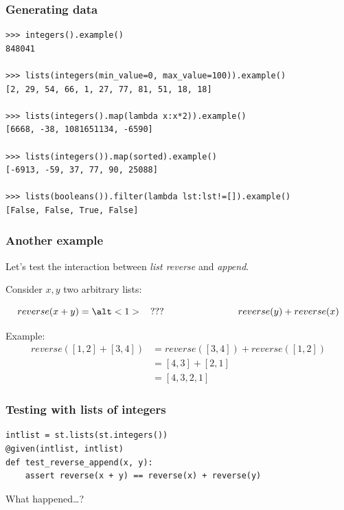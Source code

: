\documentclass{beamer}
\begin{document}
\begin{frame}[fragile]
  \frametitle{Generating data}

\begin{verbatim}
>>> integers().example()
848041

>>> lists(integers(min_value=0, max_value=100)).example()
[2, 29, 54, 66, 1, 27, 77, 81, 51, 18, 18]

>>> lists(integers().map(lambda x:x*2)).example()
[6668, -38, 1081651134, -6590]

>>> lists(integers()).map(sorted).example()
[-6913, -59, 37, 77, 90, 25088]

>>> lists(booleans()).filter(lambda lst:lst!=[]).example()
[False, False, True, False]
\end{verbatim}
  
\end{frame}

\begin{frame}
  \frametitle{Another example}

  Let's test the interaction between \emph{list reverse}
  and \emph{append}.
  
  Consider $x, y$ two arbitrary lists:

  \[  reverse(x + y) = \alt<1>{\hspace{2ex}???\hspace{18ex}}{reverse(y) + reverse(x)} \]
  \pause

  Example:
  \[\begin{array}{ll}
      reverse([1,2] + [3,4]) &= reverse([3,4]) + reverse([1,2]) \\
                             &= [4,3] + [2,1]\\
                             &= [4,3,2,1]
  \end{array}\] 
\end{frame}

\begin{frame}[fragile]
  \frametitle{Testing with lists of integers}

\begin{verbatim}
intlist = st.lists(st.integers())
@given(intlist, intlist)
def test_reverse_append(x, y):
    assert reverse(x + y) == reverse(x) + reverse(y)
\end{verbatim}
\medskip
\pause
  
What happened\ldots ?  
\end{frame}
\end{document}
